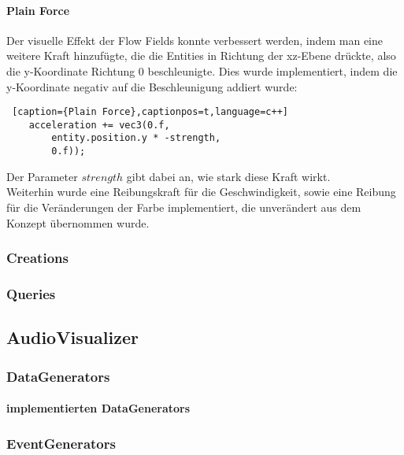 \documentclass[11pt,a4paper]{article}
\begin{document}
\paragraph{Plain Force}
Der visuelle Effekt der Flow Fields konnte verbessert werden, indem man eine weitere Kraft hinzufügte, die die Entities in Richtung der xz-Ebene drückte, also die y-Koordinate Richtung 0 beschleunigte. Dies wurde implementiert, indem die y-Koordinate negativ auf die Beschleunigung addiert wurde:
\begin{lstlisting} [caption={Plain Force},captionpos=t,language=c++]
	acceleration += vec3(0.f,
		entity.position.y * -strength,
		0.f));
\end{lstlisting}
\noindent
Der Parameter $strength$ gibt dabei an, wie stark diese Kraft wirkt.\\
Weiterhin wurde eine Reibungskraft für die Geschwindigkeit, sowie eine Reibung für die Veränderungen der Farbe implementiert, die unverändert aus dem Konzept übernommen wurde.

\newpage

\subsubsection*{Creations}

\subsubsection*{Queries}

\subsection{AudioVisualizer}

\subsubsection*{DataGenerators}

\paragraph{implementierten DataGenerators}


\subsubsection*{EventGenerators}
\end{document}
